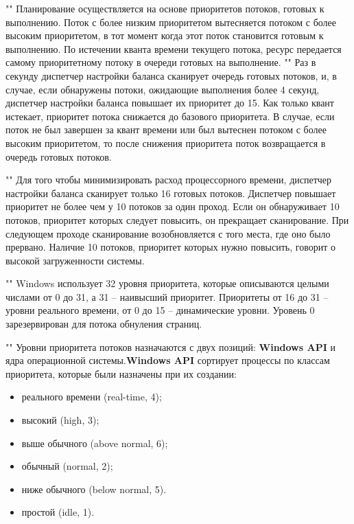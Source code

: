 ""\newline 
\noindent Планирование осуществляется на основе приоритетов потоков, готовых к выполнению. Поток с более низким приоритетом вытесняется потоком с более высоким приоритетом, в тот момент когда этот поток становится готовым к выполнению. По истечении кванта времени текущего потока, ресурс передается самому приоритетному потоку в очереди готовых на выполнение.
""\newline
\noindent Раз в секунду диспетчер настройки баланса сканирует очередь готовых потоков, и, в случае, если обнаружены потоки, ожидающие выполнения более 4 секунд, диспетчер настройки баланса повышает их приоритет до 15. Как только квант истекает, приоритет потока снижается до базового приоритета. В случае, если поток не был завершен за квант времени или был вытеснен потоком с более высоким приоритетом, то после снижения приоритета поток возвращается в очередь готовых потоков.

""\newline 
\noindent Для того чтобы минимизировать расход процессорного времени, диспетчер настройки баланса сканирует только 16 готовых потоков. Диспетчер повышает приоритет не более чем у 10 потоков за один проход. Если он обнаруживает 10 потоков, приоритет которых следует повысить, он прекращает сканирование. При следующем проходе сканирование возобновляется с того места, где оно было прервано. Наличие 10 потоков, приоритет которых нужно повысить, говорит о высокой загруженности системы.

""\newline 
\noindent Windows использует 32 уровня приоритета, которые описываются целыми числами от 0 до 31, а 31 -- наивысший приоритет. Приоритеты от 16 до 31 -- уровни реального времени, от 0 до 15 -- динамические уровни. Уровень 0 зарезервирован для потока обнуления страниц.

""\newline
\noindent Уровни приоритета потоков назначаются с двух позиций: \textbf{Windows API} и ядра операционной системы.\textbf{Windows API} сортирует процессы по классам приоритета, которые были назначены при их создании:

\begin{itemize}
    \item реального времени (real-time, 4);
    \item высокий (high, 3);
    \item выше обычного (above normal, 6);
    \item обычный (normal, 2);
    \item ниже обычного (below normal, 5).
    \item простой (idle, 1).
\end{itemize}

